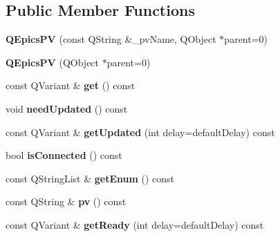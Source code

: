 \subsection*{Public Member Functions}
\begin{DoxyCompactItemize}
\item 
\hypertarget{classQEpicsPV_a54db46d78f774a6d9df94c867e770999}{
{\bfseries QEpicsPV} (const QString \&\_\-pvName, QObject $\ast$parent=0)}
\label{classQEpicsPV_a54db46d78f774a6d9df94c867e770999}

\item 
\hypertarget{classQEpicsPV_a6cd2c5e9a21cb7db5ba4d05b257078c5}{
{\bfseries QEpicsPV} (QObject $\ast$parent=0)}
\label{classQEpicsPV_a6cd2c5e9a21cb7db5ba4d05b257078c5}

\item 
\hypertarget{classQEpicsPV_a18c74dd69c99859820564751a90a031e}{
const QVariant \& {\bfseries get} () const }
\label{classQEpicsPV_a18c74dd69c99859820564751a90a031e}

\item 
\hypertarget{classQEpicsPV_a54c0ba3a4e6bcbc398e2cc6d222e0ecf}{
void {\bfseries needUpdated} () const }
\label{classQEpicsPV_a54c0ba3a4e6bcbc398e2cc6d222e0ecf}

\item 
\hypertarget{classQEpicsPV_aa66e3560c7eea600befc715295647bd6}{
const QVariant \& {\bfseries getUpdated} (int delay=defaultDelay) const }
\label{classQEpicsPV_aa66e3560c7eea600befc715295647bd6}

\item 
\hypertarget{classQEpicsPV_acaaa648d56d3aae9fcd21a0b45cb4e70}{
bool {\bfseries isConnected} () const }
\label{classQEpicsPV_acaaa648d56d3aae9fcd21a0b45cb4e70}

\item 
\hypertarget{classQEpicsPV_af4c1963fad08239724f13c9d5375a8fe}{
const QStringList \& {\bfseries getEnum} () const }
\label{classQEpicsPV_af4c1963fad08239724f13c9d5375a8fe}

\item 
\hypertarget{classQEpicsPV_a0edc1c812cbb73b0cd929a8ad3e38229}{
const QString \& {\bfseries pv} () const }
\label{classQEpicsPV_a0edc1c812cbb73b0cd929a8ad3e38229}

\item 
\hypertarget{classQEpicsPV_a2c4b523e6bf14f88b1e7996d10800929}{
const QVariant \& {\bfseries getReady} (int delay=defaultDelay) const }
\label{classQEpicsPV_a2c4b523e6bf14f88b1e7996d10800929}

\end{DoxyCompactItemize}

